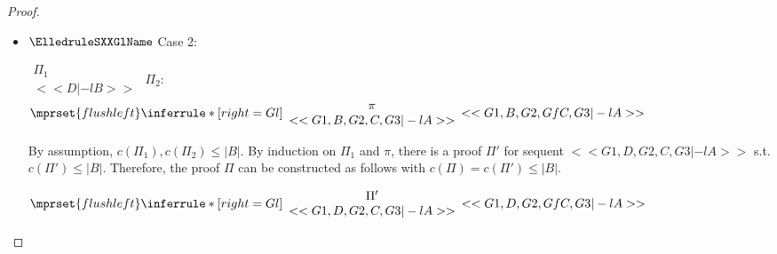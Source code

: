 \begin{proof}
\begin{enumerate}
\begin{itemize}
  \item $\ElledruleSXXGlName$ Case 2:
    \begin{center}
      \scriptsize
      \begin{math}
        \begin{array}{c}
          \Pi_1 \\
          {<<D |-l B>>}
        \end{array}
      \end{math}
      \qquad\qquad
      $\Pi_2$:
      \begin{math}
        $$\mprset{flushleft}
        \inferrule* [right={\tiny Gl}] {
          {
            \begin{array}{c}
              \pi \\
              {<<G1, B, G2, C, G3 |-l A>>}
            \end{array}
          }
        }{<<G1, B, G2, Gf C, G3 |-l A>>}
      \end{math}
    \end{center}
    By assumption, $c(\Pi_1),c(\Pi_2)\leq |B|$. By induction on $\Pi_1$ and $\pi$, there is a
    proof $\Pi'$ for sequent $<<G1, D, G2, C, G3 |-l A>>$ s.t. $c(\Pi') \leq |B|$. Therefore,
    the proof $\Pi$ can be constructed as follows with $c(\Pi) = c(\Pi') \leq |B|$.
    \begin{center}
      \scriptsize
      \begin{math}
        $$\mprset{flushleft}
        \inferrule* [right={\tiny Gl}] {
          {
            \begin{array}{c}
              \Pi' \\
              {<<G1, D, G2, C, G3 |-l A>>}
            \end{array}
          }
        }{<<G1, D, G2, Gf C, G3 |-l A>>}
      \end{math}
    \end{center}


\end{itemize}
\end{enumerate}
\end{proof}
